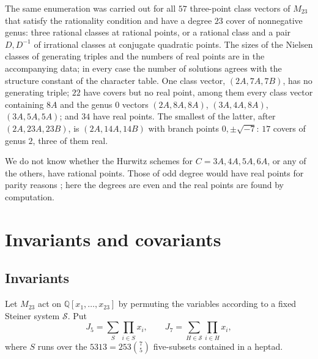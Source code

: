 \documentclass[11pt]{amsart}
\theoremstyle{definition}
\newcommand{\QQ}{\mathbb{Q}}
\newcommand{\M}{M_{23}}
\newcommand{\cS}{\mathcal{S}}
\begin{document}
The same enumeration was carried out for all $57$ three-point class vectors of $\M$ that satisfy the rationality condition and have a degree $23$ cover of nonnegative genus: three rational classes at rational points, or a rational class and a pair $D,D^{-1}$ of irrational classes at conjugate quadratic points. The sizes of the Nielsen classes of generating triples and the numbers of real points are in the accompanying data; in every case the number of solutions agrees with the structure constant of the character table. One class vector, $(2A,7A,7B)$, has no generating triple; $22$ have covers but no real point, among them every class vector containing $8A$ and the genus $0$ vectors $(2A,8A,8A)$, $(3A,4A,8A)$, $(3A,5A,5A)$; and $34$ have real points. The smallest of the latter, after $(2A,23A,23B)$, is $(2A,14A,14B)$ with branch points $0,\pm\sqrt{-7}$: $17$ covers of genus $2$, three of them real.

We do not know whether the Hurwitz schemes for $C=3A,4A,5A,6A$, or any of the others, have rational points. Those of odd degree would have real points for parity reasons \cite{Janik26}; here the degrees are even and the real points are found by computation.

\section{Invariants and covariants}\label{sec:invariants}

\subsection{Invariants}
Let $\M$ act on $\QQ[x_1,\dots,x_{23}]$ by permuting the variables according to a fixed Steiner system $\cS$. Put
\[
J_5=\sum_{S}\prod_{i\in S}x_i,\qquad J_7=\sum_{H\in\cS}\prod_{i\in H}x_i ,
\]
where $S$ runs over the $5313=253\binom75$ five-subsets contained in a heptad.
\end{document}
